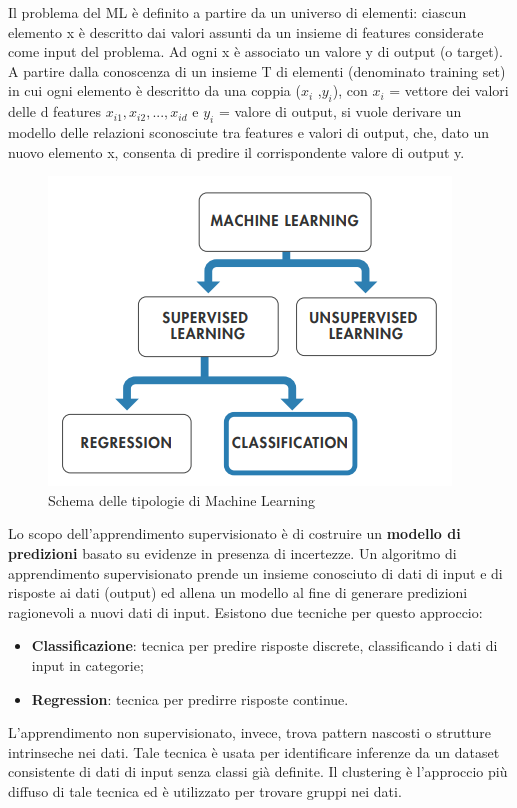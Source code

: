 Il problema del ML è definito a partire da un universo di elementi: ciascun elemento x è descritto dai valori assunti da un insieme di features considerate come input del problema. Ad ogni x è associato un valore y di output (o target). A partire dalla conoscenza di un insieme T di elementi (denominato training set) in cui ogni elemento è descritto da una coppia ($x_i$ ,$y_i$), con $x_i$ = vettore dei valori delle d features $x_{i1}, x_{i2}, ... , x_{id}$ e $y_i$ = valore di output, si vuole derivare un modello delle relazioni sconosciute tra features e valori di output, che, dato un nuovo elemento x, consenta di predire il corrispondente valore di output y. 
\begin{figure}[]
	\centering
	\includegraphics[scale=0.8]{images/Tipologie_Machine_Learning.png}
	\caption{Schema delle tipologie di Machine Learning}
\end{figure}
Lo scopo dell'apprendimento supervisionato è di costruire un \textbf{modello di predizioni} basato su evidenze in presenza di incertezze. Un algoritmo di apprendimento supervisionato prende un insieme conosciuto di dati di input e di risposte ai dati (output) ed allena un modello al fine di generare predizioni ragionevoli a nuovi dati di input. Esistono due tecniche per questo approccio:
\begin{itemize}
	\item \textbf{Classificazione}: tecnica per predire risposte discrete, classificando i dati di input in categorie;
	\item \textbf{Regression}: tecnica per predirre risposte continue.
\end{itemize}
L'apprendimento non supervisionato, invece, trova pattern nascosti o strutture intrinseche nei dati. Tale tecnica è usata per identificare inferenze da un dataset consistente di dati di input senza classi già definite. Il clustering è l'approccio più diffuso di tale tecnica ed è utilizzato per trovare gruppi nei dati.\\
